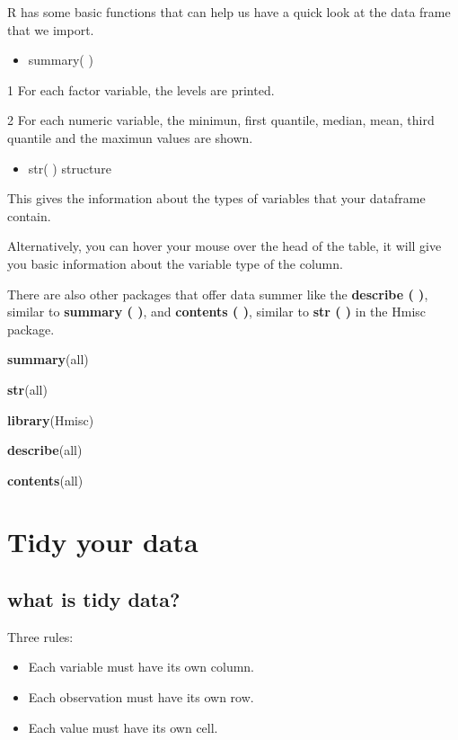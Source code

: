 \documentclass[]{book}
\newenvironment{Shaded}{\begin{snugshade}}{\end{snugshade}}
\newcommand{\KeywordTok}[1]{\textcolor[rgb]{0.13,0.29,0.53}{\textbf{#1}}}
\newcommand{\NormalTok}[1]{#1}
\providecommand{\tightlist}{%
  \setlength{\itemsep}{0pt}\setlength{\parskip}{0pt}}
\begin{document}
R has some basic functions that can help us have a quick look at the
data frame that we import.

\begin{itemize}
\tightlist
\item
  summary( )
\end{itemize}

1 For each factor variable, the levels are printed.

2 For each numeric variable, the minimun, first quantile, median, mean,
third quantile and the maximun values are shown.

\begin{itemize}
\tightlist
\item
  str( ) structure
\end{itemize}

This gives the information about the types of variables that your
dataframe contain.

Alternatively, you can hover your mouse over the head of the table, it
will give you basic information about the variable type of the column.

There are also other packages that offer data summer like the
\textbf{describe ( )}, similar to \textbf{summary ( )}, and
\textbf{contents ( )}, similar to \textbf{str ( )} in the Hmisc package.

\begin{Shaded}
\begin{Highlighting}[]
\KeywordTok{summary}\NormalTok{(all)}

\KeywordTok{str}\NormalTok{(all)}

\KeywordTok{library}\NormalTok{(Hmisc)}

\KeywordTok{describe}\NormalTok{(all)}

\KeywordTok{contents}\NormalTok{(all)}
\end{Highlighting}
\end{Shaded}

\chapter{Tidy your data}\label{tidy-your-data}

\section{what is tidy data?}\label{what-is-tidy-data}

Three rules:

\begin{itemize}
\item
  Each variable must have its own column.
\item
  Each observation must have its own row.
\item
  Each value must have its own cell.
\end{itemize}
\end{document}
